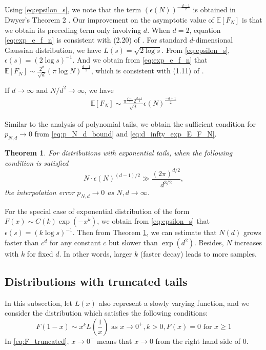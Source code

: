\documentclass[conference,a4paper]{IEEEtran}
\def\E{\mathbb{E}}
\newtheorem{theorem}{Theorem}
\begin{document}
 Using \eqref{eq:epsilon_s}, we note that the term
 $(\epsilon(N))^{-\frac{d-1}{2}}$
 is obtained in Dwyer's Theorem 2 \cite{dwyer1991convex}.
 Our improvement on the asymptotic value of $\E[F_N]$ is that we obtain its preceding term only involving $d$.
 When $d=2$, equation \eqref{eq:exp_e_f_n} is consistent with (2.20) of \cite{carnal1970konvexe}.
 For standard $d$-dimensional Gaussian distribution, we have $L(s)=\sqrt{2\log s}$.
 From \eqref{eq:epsilon_s}, $\epsilon(s) = (2\log s)^{-1}$. And we obtain from \eqref{eq:exp_e_f_n}
 that $\E[F_N]\sim \frac{2^d}{\sqrt{d}}(\pi \log N)^{\frac{d-1}{2}}$,
 which is consistent with (1.11) of \cite{raynaud1970enveloppe}.

 If $d\to\infty$ and $N/d^2\to \infty$, we have
\begin{align}\label{eq:d_infty_exp_E_F_N}
      \E[F_N]\sim \frac{\pi^{\frac{d-1}{2}} 2^{\frac{d+1}{2}}}{\sqrt{d}} \epsilon(N)^{\frac{-d+1}{2}}
\end{align}

Similar to the analysis of polynomial tails, we obtain the
sufficient condition for $p_{N,d} \to 0$ from
\eqref{eq:p_N_d_bound} and \eqref{eq:d_infty_exp_E_F_N}.
\begin{theorem}\label{thm:exp_tails_sample}
  For distributions with exponential tails, when the following condition is satisfied
  \begin{equation}
    N\cdot \epsilon(N)^{(d-1)/2} \gg \frac{(2\pi)^{d/2}}{d^{3/2}},
  \end{equation}
  the interpolation error $p_{N,d} \to 0$ as $N,d\to \infty$.
\end{theorem}
For the special case of exponential distribution
of the form $F(x) \sim C(k)\exp(-x^k)$, we obtain from \eqref{eq:epsilon_s}
that $\epsilon(s)=(k\log s)^{-1}$.
Then from Theorem \ref{thm:exp_tails_sample},
we can estimate that
$N(d)$ grows faster than $c^d$ for any constant $c$ but slower than $\exp(d^2)$.
Besides, $N$ increases with $k$ for fixed $d$.
In other words, larger $k$ (faster decay) leads to more samples.

\subsection{Distributions with truncated tails}
In this subsection, let $L(x)$ also represent a slowly varying function, and we consider the distribution which satisfies
the following conditions:
\begin{equation}\label{eq:F_truncated}
     F(1-x) \sim x^k L\left(\frac{1}{x} \right)  \text{ as } x \to 0^+, k> 0,
     F(x) = 0 \text{ for } x \geq 1
\end{equation}
In \eqref{eq:F_truncated}, $x \to 0^+$ means that $x\to 0$ from the right hand side of $0$.
\end{document}
